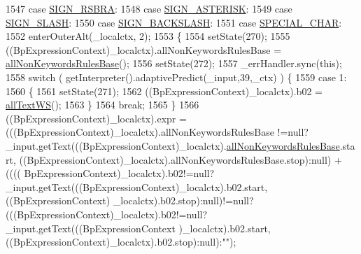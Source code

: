 \begin{DoxyCode}
1547       \textcolor{keywordflow}{case} \hyperlink{classgov_1_1nasa_1_1jpf_1_1inspector_1_1client_1_1parser_1_1_console_grammar_parser_afdec45e08b19740283701921c8192f7b}{SIGN\_RSBRA}:
1548       \textcolor{keywordflow}{case} \hyperlink{classgov_1_1nasa_1_1jpf_1_1inspector_1_1client_1_1parser_1_1_console_grammar_parser_ad92bebb0c2308d9422bf40bd757fa623}{SIGN\_ASTERISK}:
1549       \textcolor{keywordflow}{case} \hyperlink{classgov_1_1nasa_1_1jpf_1_1inspector_1_1client_1_1parser_1_1_console_grammar_parser_a4048b83fec020550f08eb7f44df0a486}{SIGN\_SLASH}:
1550       \textcolor{keywordflow}{case} \hyperlink{classgov_1_1nasa_1_1jpf_1_1inspector_1_1client_1_1parser_1_1_console_grammar_parser_ad9ff891626d90dc1ee921de2a2335399}{SIGN\_BACKSLASH}:
1551       \textcolor{keywordflow}{case} \hyperlink{classgov_1_1nasa_1_1jpf_1_1inspector_1_1client_1_1parser_1_1_console_grammar_parser_a978bd8334dd75839036a09d94b04280f}{SPECIAL\_CHAR}:
1552         enterOuterAlt(\_localctx, 2);
1553         \{
1554         setState(270);
1555         ((BpExpressionContext)\_localctx).allNonKeywordsRulesBase = 
      \hyperlink{classgov_1_1nasa_1_1jpf_1_1inspector_1_1client_1_1parser_1_1_console_grammar_parser_a926661be2c5cd242388c918b3de759c3}{allNonKeywordsRulesBase}();
1556         setState(272);
1557         \_errHandler.sync(\textcolor{keyword}{this});
1558         \textcolor{keywordflow}{switch} ( getInterpreter().adaptivePredict(\_input,39,\_ctx) ) \{
1559         \textcolor{keywordflow}{case} 1:
1560           \{
1561           setState(271);
1562           ((BpExpressionContext)\_localctx).b02 = \hyperlink{classgov_1_1nasa_1_1jpf_1_1inspector_1_1client_1_1parser_1_1_console_grammar_parser_adc161fc81eedd939154fd25e889f5b28}{allTextWS}();
1563           \}
1564           \textcolor{keywordflow}{break};
1565         \}
1566          ((BpExpressionContext)\_localctx).expr =  (((BpExpressionContext)\_localctx).allNonKeywordsRulesBase
      !=null?\_input.getText(((BpExpressionContext)\_localctx).\hyperlink{classgov_1_1nasa_1_1jpf_1_1inspector_1_1client_1_1parser_1_1_console_grammar_parser_a926661be2c5cd242388c918b3de759c3}{allNonKeywordsRulesBase}.start,
      ((BpExpressionContext)\_localctx).allNonKeywordsRulesBase.stop):null) +                ((((
      BpExpressionContext)\_localctx).b02!=null?\_input.getText(((BpExpressionContext)\_localctx).b02.start,((BpExpressionContext)
      \_localctx).b02.stop):null)!=null?(((BpExpressionContext)\_localctx).b02!=null?\_input.getText(((BpExpressionContext
      )\_localctx).b02.start,((BpExpressionContext)\_localctx).b02.stop):null):\textcolor{stringliteral}{""}); 

\end{DoxyCode}
